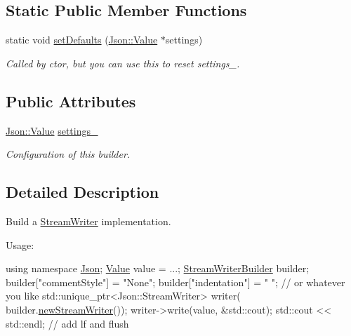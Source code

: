\subsection*{Static Public Member Functions}
\begin{DoxyCompactItemize}
\item 
static void \hyperlink{classJson_1_1StreamWriterBuilder_a53bf106b141e28637b01ad0ecd2acbf6}{set\+Defaults} (\hyperlink{classJson_1_1Value}{Json\+::\+Value} $\ast$settings)
\begin{DoxyCompactList}\small\item\em Called by ctor, but you can use this to reset settings\+\_\+. \end{DoxyCompactList}\end{DoxyCompactItemize}
\subsection*{Public Attributes}
\begin{DoxyCompactItemize}
\item 
\hyperlink{classJson_1_1Value}{Json\+::\+Value} \hyperlink{classJson_1_1StreamWriterBuilder_a79bdf2e639a52f4e758c0b95bd1d3423}{settings\+\_\+}
\begin{DoxyCompactList}\small\item\em Configuration of this builder. \end{DoxyCompactList}\end{DoxyCompactItemize}


\subsection{Detailed Description}
Build a \hyperlink{classJson_1_1StreamWriter}{Stream\+Writer} implementation. 

Usage\+: 
\begin{DoxyCode}
\textcolor{keyword}{using namespace }\hyperlink{namespaceJson}{Json};
\hyperlink{classJson_1_1Value}{Value} value = ...;
\hyperlink{classJson_1_1StreamWriterBuilder}{StreamWriterBuilder} builder;
builder[\textcolor{stringliteral}{"commentStyle"}] = \textcolor{stringliteral}{"None"};
builder[\textcolor{stringliteral}{"indentation"}] = \textcolor{stringliteral}{"   "};  \textcolor{comment}{// or whatever you like}
std::unique\_ptr<Json::StreamWriter> writer(
    builder.\hyperlink{classJson_1_1StreamWriterBuilder_ab9ee278609f88ae04a7c1a84e1f559e6}{newStreamWriter}());
writer->write(value, &std::cout);
std::cout << std::endl;  \textcolor{comment}{// add lf and flush}
\end{DoxyCode}
 

